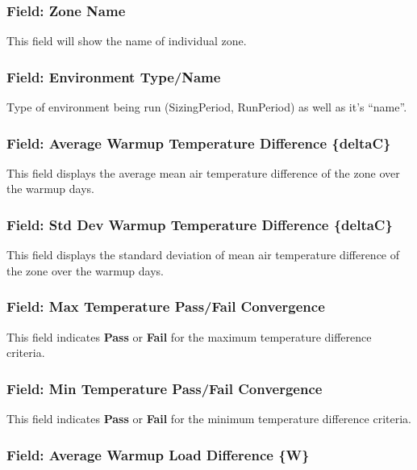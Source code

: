 \subsubsection{Field: Zone Name}

This field will show the name of individual zone.

\subsubsection{Field: Environment Type/Name}

Type of environment being run (SizingPeriod, RunPeriod) as well as it's ``name''.

\subsubsection{Field: Average Warmup Temperature Difference \{deltaC\}}

This field displays the average mean air temperature difference of the zone over the warmup days.

\subsubsection{Field: Std Dev Warmup Temperature Difference \{deltaC\}}

This field displays the standard deviation of mean air temperature difference of the zone over the warmup days.

\subsubsection{Field: Max Temperature Pass/Fail Convergence}

This field indicates \textbf{Pass} or \textbf{Fail} for the maximum temperature difference criteria.

\subsubsection{Field: Min Temperature Pass/Fail Convergence}

This field indicates \textbf{Pass} or \textbf{Fail} for the minimum temperature difference criteria.

\subsubsection{Field: Average Warmup Load Difference \{W\}}

